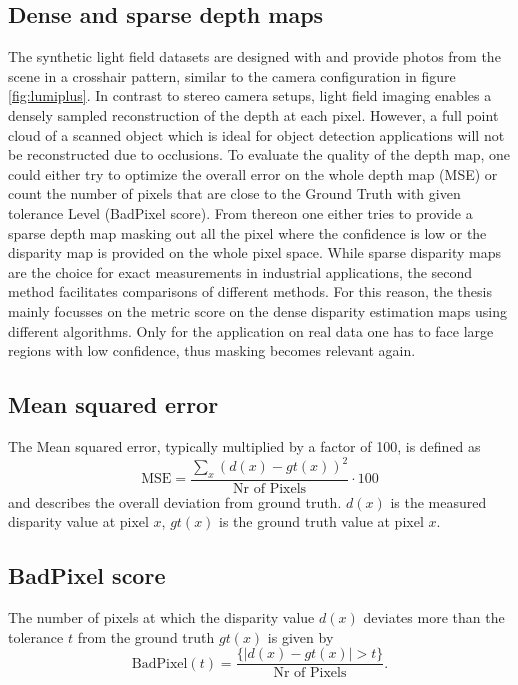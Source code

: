 \documentclass  [
  paper    = a4,
  BCOR     = 10mm,
  twoside,
  fontsize = 12pt,
  fleqn,
  toc      = bibnumbered,
  toc      = listofnumbered,
  numbers  = noendperiod,
  headings = normal,
  listof   = leveldown,
  version  = 3.03
]                                       {scrreprt}
\begin{document}
\subsection{Dense and sparse depth maps}
The synthetic light field datasets are designed with  \cite{blender2014blender} and provide photos from the scene in a crosshair pattern, similar to the camera configuration in figure \ref{fig:lumiplus}. In contrast to stereo camera setups, light field imaging enables a densely sampled reconstruction of the depth at each pixel. However, a full point cloud of a scanned object which is ideal for object detection applications will not be reconstructed due to occlusions. To evaluate the quality of the depth map, one could either try to optimize the overall error on the whole depth map (MSE) or count the number of pixels that are close to the Ground Truth with given tolerance Level (BadPixel score). From thereon one either tries to provide a sparse depth map masking out all the pixel where the confidence is low or the disparity map is provided on the whole pixel space. While sparse disparity maps are the choice for exact measurements in industrial applications, the second method facilitates comparisons of different methods. For this reason, the thesis mainly focusses on the metric score on the dense disparity estimation maps using different algorithms. Only for the application on real data one has to face large regions with low confidence, thus masking becomes relevant again.
\subsection{Mean squared error}
The Mean squared error, typically multiplied by a factor of 100, is defined as 
\begin{equation}\label{key}
\text{MSE} = \frac{\sum_x (d(x) - gt(x))^2}{\text{Nr of Pixels}} \cdot 100
\end{equation}
and describes the overall deviation from ground truth. $d(x)$ is the measured disparity value at pixel $x$, $gt(x)$ is the ground truth value at pixel $x$. 
\subsection{BadPixel score}
The number of pixels at which the disparity value $d(x)$ deviates more than the tolerance $t$ from the ground truth $gt(x)$ is given by
\begin{equation}\label{key}
\text{BadPixel}(t) = \frac{\{|d(x) - gt(x)| > t \}}{\text{Nr of Pixels}}.
\end{equation}
\end{document}
